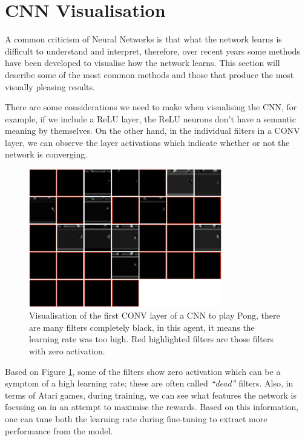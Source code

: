 \newpage

\section{CNN Visualisation}
\label{bg:sec:cnn-vis}
A common criticism of Neural Networks is that what the network learns is difficult to understand and interpret, therefore, over recent years some methods have been developed to visualise how the network learns. This section will describe some of the most common methods and those that produce the most visually pleasing results.

There are some considerations we need to make when visualising the CNN, for example, if we include a ReLU layer, the ReLU neurons don't have a semantic meaning by themselves. On the other hand, in the individual filters in a CONV layer, we can observe the layer activations which indicate whether or not the network is converging.

\begin{figure}[ht!]
	\centering
	\includegraphics[width=0.75\textwidth]{chapters/chapter2/images/viz.png}
	\caption[Visualisation of the filters from the first layer of a CNN used to play Pong]{Visualisation of the first CONV layer of a CNN to play Pong, there are many filters completely black, in this agent, it means the learning rate was too high. Red highlighted filters are those filters with zero activation.
		\label{fig:cnn-viz-activ}
	}
\end{figure}

Based on Figure \ref{fig:cnn-viz-activ}, some of the filters show zero activation which can be a symptom of a high learning rate; these are often called \textit{``dead''} filters. Also, in terms of Atari games, during training, we can see what features the network is focusing on in an attempt to maximise the rewards. Based on this information, one can tune both the learning rate during fine-tuning to extract more performance from the model.

